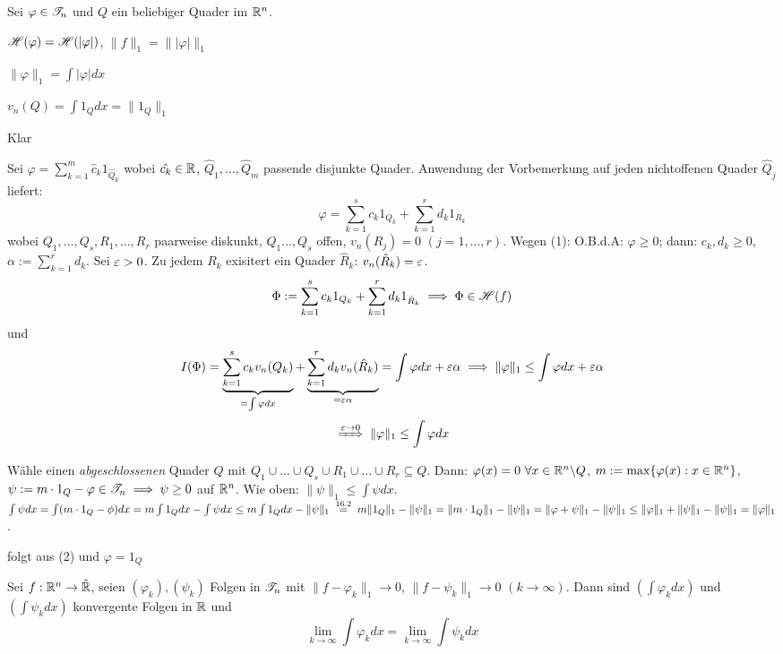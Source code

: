 \documentclass[a4paper,twoside,DIV15,BCOR12mm]{scrbook}
\begin{document}
\begin{satz}
Sei $\varphi\in\mathscr{T}_n$ und $Q$ ein beliebiger Quader im $\mathbb{R}^n$.
\begin{liste}
\item $\mathscr{H}(\varphi) = \mathscr{H}(|\varphi|)$, $\|f\|_1 = \||\varphi|\|_1$
\item $\|\varphi\|_1 = \int|\varphi| dx$
\item $v_n(Q) = \int 1_Qdx = \|1_{Q}\|_1$
\end{liste}
\end{satz}

\begin{beweise}
\item Klar
\item Sei $\varphi = \sum_{k=1}^m \hat c_k 1_{\hat Q_k}$ wobei $\hat{c_k}\in\mathbb{R}$, $\hat Q_1,\ldots,\hat Q_m$ passende disjunkte Quader. Anwendung der Vorbemerkung auf jeden nichtoffenen Quader $\hat Q_j$ liefert:
$$\varphi = \sum_{k=1}^s c_k 1_{Q_k} + \sum_{k=1}^r d_k 1_{R_k}$$
wobei $Q_1,\ldots,Q_s,R_1,\ldots,R_r$ paarweise diskunkt, $Q_1\ldots,Q_s$ offen, $v_n(R_j) = 0$ $(j=1,\ldots,r)$. Wegen (1): O.B.d.A: $\varphi \ge0$; dann: $c_k,d_k \ge 0$, $\alpha := \sum_{k=1}^r d_k$. Sei $\varepsilon>0$. Zu jedem $R_k$ exisitert ein Quader $\hat R_k$: $v_n(\hat R_k) = \varepsilon$.
$$\Phi := \sum_{k=1}^s c_k 1_{Q_k} + \sum_{k=1}^r d_k 1_{\hat R_k} \implies \Phi \in \mathscr{H}(f)$$ und $$I(\Phi) = \underbrace{\sum_{k=1}^s c_k v_n(Q_k)}_{=\int\varphi dx} + \underbrace{\sum_{k=1}^r d_k v_n(\hat R_k)}_{=\varepsilon \alpha} = \int \varphi dx + \varepsilon \alpha \implies \|\varphi\|_1 \le \int \varphi dx + \varepsilon \alpha$$ $$\folgtwegen{\ep\to0} \|\varphi\|_1 \le \int \varphi dx$$

Wähle einen \emph{abgeschlossenen} Quader $Q$ mit $Q_1\cup\ldots\cup Q_s\cup R_1\cup\ldots\cup R_r \subseteq Q$. Dann: $\varphi(x)=0 \ \forall x\in\mathbb{R}^n\backslash Q$, $m:= \max\{\varphi(x):x\in\mathbb{R}^n\}$, $\psi:= m\cdot 1_{Q}-\varphi \in \mathscr{T}_n \implies \psi \ge 0$ auf $\mathbb{R}^n$. Wie oben: $\|\psi\|_1\le\int\psi dx$.
$\int \psi dx = \int (m\cdot 1_Q -\phi)dx = m\int1_Q dx-\int\psi dx \le m \int 1_Q dx - \|\psi\|_1 \gleichnach{16.2} m \|1_Q\|_1 - \|\psi\|_1 = \|m\cdot1_Q\|_1 - \|\psi\|_1 = \|\varphi + \psi\|_1 - \|\psi\|_1 \le \|\varphi\|_1 + \|\psi\|_1 - \|\psi\|_1 = \|\varphi\|_1$.
\item folgt aus (2) und $\varphi = 1_{Q}$
\end{beweise}

\begin{satz}
Sei $f:\mathbb{R}^n \to \tilde {\mathbb{R}}$, seien $(\varphi_k),(\psi_k)$ Folgen in $\mathscr{T}_n$ mit $\|f-\varphi_k\|_1 \to 0$, $\|f-\psi_k\|_1 \to 0$ $(k\to\infty)$. Dann sind $(\int\varphi_k dx)$ und $(\int \psi_kdx)$ konvergente Folgen in $\mathbb{R}$ und 
\[\lim_{k\to\infty} \int \varphi_k dx = \lim_{k\to\infty} \int \psi_k dx\]
\end{satz}
\end{document}
